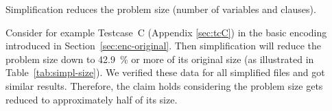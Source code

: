 \begin{prop}
  Simplification reduces the problem size (number of variables and clauses).
\end{prop}

%

Consider for example Testcase~C (Appendix \ref{sec:tcC}) in the basic encoding
introduced in Section~\ref{sec:enc-original}. Then simplification will reduce the problem
size down to 42.9~\% or more of its original size (as illustrated in Table~\ref{tab:simpl-size}).
We verified these data for all simplified files and got similar results.
Therefore, the claim holds considering the problem size gets reduced to
approximately half of its size.

